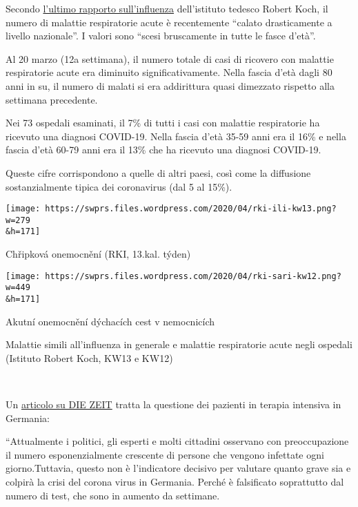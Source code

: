 Secondo
\href{https://influenza.rki.de/Wochenberichte/2019_2020/2020-13.pdf}{l'ultimo
rapporto sull'influenza} dell'istituto tedesco Robert Koch, il numero di
malattie respiratorie acute è recentemente ``calato drasticamente a
livello nazionale''. I valori sono ``scesi bruscamente in tutte le fasce
d'età''.

Al 20 marzo (12a settimana), il numero totale di casi di ricovero con
malattie respiratorie acute era diminuito significativamente. Nella
fascia d'età dagli 80 anni in su, il numero di malati si era addirittura
quasi dimezzato rispetto alla settimana precedente.

Nei 73 ospedali esaminati, il 7\% di tutti i casi con malattie
respiratorie ha ricevuto una diagnosi COVID-19. Nella fascia d'età 35-59
anni era il 16\% e nella fascia d'età 60-79 anni era il 13\% che ha
ricevuto una diagnosi COVID-19.

Queste cifre corrispondono a quelle di altri paesi, così come la
diffusione sostanzialmente tipica dei coronavirus (dal 5 al 15\%).

\href{https://swprs.files.wordpress.com/2020/04/rki-ili-kw13.png}{}

\texttt{[image: https://swprs.files.wordpress.com/2020/04/rki-ili-kw13.png?w=279\\\&h=171]}

Chřipková onemocnění (RKI, 13.kal. týden)

\href{https://swprs.files.wordpress.com/2020/04/rki-sari-kw12.png}{}

\texttt{[image: https://swprs.files.wordpress.com/2020/04/rki-sari-kw12.png?w=449\\\&h=171]}

Akutní onemocnění dýchacích cest v nemocnicích

Malattie simili all'influenza in generale e malattie respiratorie acute
negli ospedali (Istituto Robert Koch, KW13 e KW12)

~

Un
\href{https://www.zeit.de/wissen/2020-04/krankenhaeuser-kapazitaeten-coronavirus-patienten-deutschland/seite-2}{articolo
su DIE ZEIT} tratta la questione dei pazienti in terapia intensiva in
Germania:

``Attualmente i politici, gli esperti e molti cittadini osservano con
preoccupazione il numero esponenzialmente crescente di persone che
vengono infettate ogni giorno.Tuttavia, questo non è l'indicatore
decisivo per valutare quanto grave sia e colpirà la crisi del corona
virus in Germania. Perché è falsificato soprattutto dal numero di test,
che sono in aumento da settimane.

